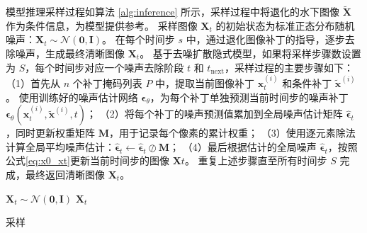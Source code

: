 模型推理采样过程如算法 \ref{alg:inference} 所示，采样过程中将退化的水下图像 $\tilde{\bm{X}}$ 作为条件信息，为模型提供参考。
采样图像 $\bm{X}_t$ 的初始状态为标准正态分布随机噪声：$\bm{X}_t \sim \mathcal{N}(\mathbf{0}, \mathbf{I})$。
在每个时间步 $s$ 中，通过退化图像补丁的指导，逐步去除噪声，生成最终清晰图像 $\bm{X}_t$。
基于去噪扩散隐式模型，如果将采样步骤数设置为 $S$，每个时间步对应一个噪声去除阶段 $t$ 和 $t_{\text{next}}$，采样过程的主要步骤如下：
（1）首先从 $n$ 个补丁掩码列表 $P$ 中，提取当前图像补丁 $\mathbf{x}_t^{(i)}$ 和条件补丁 $\tilde{\mathbf{x}}^{(i)}$。
使用训练好的噪声估计网络 $\bm{\epsilon}_\theta$，为每个补丁单独预测当前时间步的噪声补丁 $\bm{\epsilon}_\theta\left(\mathbf{x}_t^{(i)}, \tilde{\mathbf{x}}^{(i)}, t\right)$；
（2）将每个补丁的噪声预测值累加到全局噪声估计矩阵 $\bm{\hat{\epsilon}}_t$，同时更新权重矩阵 $\mathbf{M}$，用于记录每个像素的累计权重；
（3）使用逐元素除法计算全局平均噪声估计：$\bm{\hat{\epsilon}}_t \leftarrow \bm{\hat{\epsilon}}_t \oslash \mathbf{M}$；
（4）最后根据估计的全局噪声 $\bm{\hat{\epsilon}}_t$，按照公式\eqref{eq:x0_xt}更新当前时间步的图像 $\bm{X}t$。
重复上述步骤直至所有时间步 $S$ 完成，最终返回清晰图像 $\bm{X}_t$。
\begin{algorithm}[ht]
    \SetAlgoLined
  
    $\bm{X}_{t} \sim \mathcal{N}(\mathbf{0}, \mathbf{I})$\;
    \Return $\bm{X}_t$\;
    \caption{采样}
    \label{alg:inference}
  \end{algorithm}


